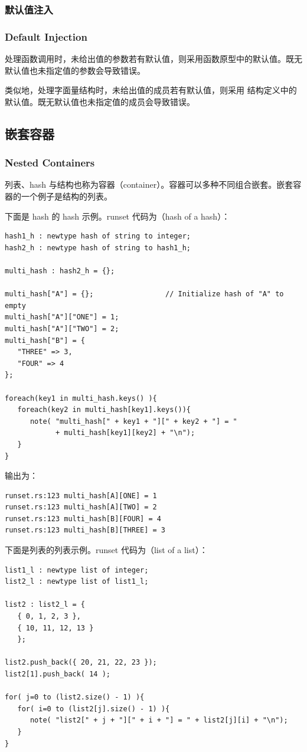 \subsubsection{默认值注入}
\subsubsection*{Default Injection}

处理函数调用时，未给出值的参数若有默认值，则采用函数原型中的默认值。既无默认值也未指定值的参数会导致错误。

类似地，处理字面量结构时，未给出值的成员若有默认值，则采用  结构定义中的默认值。既无默认值也未指定值的成员会导致错误。

\subsection{嵌套容器}
\subsubsection*{Nested Containers}
\label{sec:pxl-nested-containers}

列表、hash 与结构也称为容器（container）。容器可以多种不同组合嵌套。嵌套容器的一个例子是结构的列表。

下面是 hash 的 hash 示例。runset 代码为（hash of a hash）：
\begin{lstlisting}[style=pxl]
hash1_h : newtype hash of string to integer;
hash2_h : newtype hash of string to hash1_h;

multi_hash : hash2_h = {};

multi_hash["A"] = {};                 // Initialize hash of "A" to empty
multi_hash["A"]["ONE"] = 1;
multi_hash["A"]["TWO"] = 2;
multi_hash["B"] = {
   "THREE" => 3,
   "FOUR" => 4
};

foreach(key1 in multi_hash.keys() ){
   foreach(key2 in multi_hash[key1].keys()){
      note( "multi_hash[" + key1 + "][" + key2 + "] = "
            + multi_hash[key1][key2] + "\n");
   }
}
\end{lstlisting}

输出为：
\begin{lstlisting}
runset.rs:123 multi_hash[A][ONE] = 1
runset.rs:123 multi_hash[A][TWO] = 2
runset.rs:123 multi_hash[B][FOUR] = 4
runset.rs:123 multi_hash[B][THREE] = 3
\end{lstlisting}

下面是列表的列表示例。runset 代码为（list of a list）：
\begin{lstlisting}[style=pxl]
list1_l : newtype list of integer;
list2_l : newtype list of list1_l;

list2 : list2_l = {
   { 0, 1, 2, 3 },
   { 10, 11, 12, 13 }
   };

list2.push_back({ 20, 21, 22, 23 });
list2[1].push_back( 14 );

for( j=0 to (list2.size() - 1) ){
   for( i=0 to (list2[j].size() - 1) ){
      note( "list2[" + j + "][" + i + "] = " + list2[j][i] + "\n");
   }
}
\end{lstlisting}

